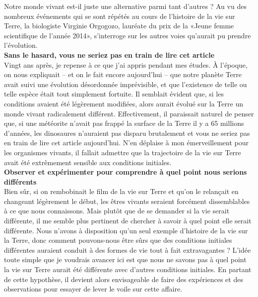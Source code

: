 \documentclass[8pt]{article}
\begin{document}
Notre monde vivant est-il juste une alternative parmi tant d’autres ? Au vu des nombreux événements qui se sont répétés au cours de l’histoire de la vie sur Terre, la biologiste Virginie Orgogozo, lauréate du prix de la «Jeune femme scientifique de l’année 2014», s’interroge sur les autres voies qu’aurait pu prendre l’évolution. \\


\textbf{ Sans le hasard, vous ne seriez pas en train de lire cet article}\\

Vingt ans après, je repense à ce que j’ai appris pendant mes études. À l’époque, on nous expliquait – et on le fait encore aujourd’hui – que notre planète Terre avait suivi une évolution désordonnée imprévisible, et que l’existence de telle ou telle espèce était tout simplement fortuite. Il semblait évident que, si les conditions avaient été légèrement modifiées, alors aurait évolué sur la Terre un monde vivant radicalement différent. Effectivement, il paraissait naturel de penser que, si une météorite n’avait pas frappé la surface de la Terre il y a 65 millions d’années, les dinosaures n’auraient pas disparu brutalement et vous ne seriez pas en train de lire cet article aujourd’hui. N’en déplaise à mon émerveillement pour les organismes vivants, il fallait admettre que la trajectoire de la vie sur Terre avait été extrêmement sensible aux conditions initiales.\\

\textbf{Observer et expérimenter pour comprendre à quel point nous serions différents}\\

Bien sûr, si on rembobinait le film de la vie sur Terre et qu’on le relançait en changeant légèrement le début, les êtres vivants seraient forcément dissemblables à ce que nous connaissons. Mais plutôt que de se demander si la vie serait différente, il me semble plus pertinent de chercher à savoir à quel point elle serait différente. Nous n’avons à disposition qu’un seul exemple d’histoire de la vie sur la Terre, donc comment pouvons-nous être sûrs que des conditions initiales différentes auraient conduit à des formes de vie tout à fait extravagantes ? L’idée toute simple que je voudrais avancer ici est que nous ne savons pas à quel point la vie sur Terre aurait été différente avec d’autres conditions initiales. En partant de cette hypothèse, il devient alors envisageable de faire des expériences et des observations pour essayer de lever le voile sur cette affaire.
\\
\end{document}
